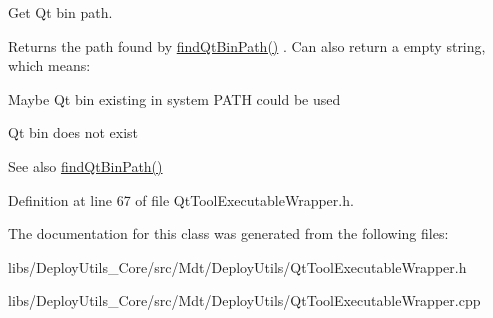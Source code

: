 Get Qt bin path. 

Returns the path found by \hyperlink{class_mdt_1_1_deploy_utils_1_1_qt_tool_executable_wrapper_affa733c47d5633c5eca8b365f464eb18}{find\+Qt\+Bin\+Path()} . Can also return a empty string, which means\+:
\begin{DoxyItemize}
\item Maybe Qt bin existing in system P\+A\+TH could be used
\item Qt bin does not exist
\end{DoxyItemize}

\begin{DoxySeeAlso}{See also}
\hyperlink{class_mdt_1_1_deploy_utils_1_1_qt_tool_executable_wrapper_affa733c47d5633c5eca8b365f464eb18}{find\+Qt\+Bin\+Path()} 
\end{DoxySeeAlso}


Definition at line 67 of file Qt\+Tool\+Executable\+Wrapper.\+h.



The documentation for this class was generated from the following files\+:\begin{DoxyCompactItemize}
\item 
libs/\+Deploy\+Utils\+\_\+\+Core/src/\+Mdt/\+Deploy\+Utils/Qt\+Tool\+Executable\+Wrapper.\+h\item 
libs/\+Deploy\+Utils\+\_\+\+Core/src/\+Mdt/\+Deploy\+Utils/Qt\+Tool\+Executable\+Wrapper.\+cpp\end{DoxyCompactItemize}
